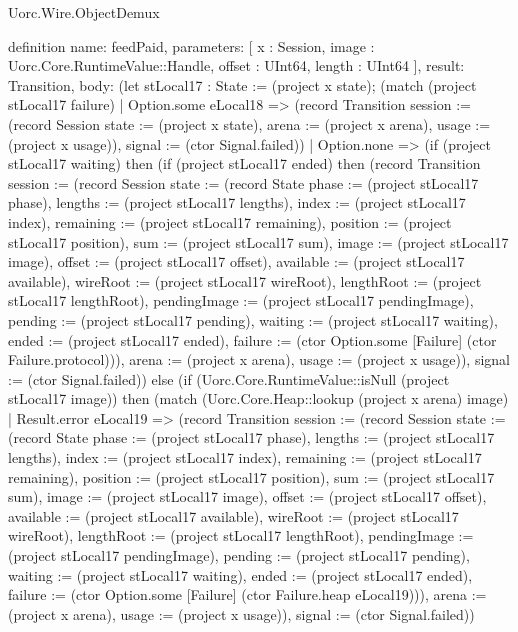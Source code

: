 \begin{lexlean}{Uorc.Wire.ObjectDemux}
\begin{semanticmodule}
definition{
  name: feedPaid,
  parameters: [
    x : Session,
    image : Uorc.Core.RuntimeValue::Handle,
    offset : UInt64,
    length : UInt64
  ],
  result: Transition,
  body: (let stLocal17 : State := (project x state); (match (project stLocal17 failure)
    | Option.some eLocal18 => (record Transition {session := (record Session {state := (project x state), arena := (project x arena), usage := (project x usage)}), signal := (ctor Signal.failed)})
    | Option.none => (if (project stLocal17 waiting) then (if (project stLocal17 ended) then (record Transition {session := (record Session {state := (record State {phase := (project stLocal17 phase), lengths := (project stLocal17 lengths), index := (project stLocal17 index), remaining := (project stLocal17 remaining), position := (project stLocal17 position), sum := (project stLocal17 sum), image := (project stLocal17 image), offset := (project stLocal17 offset), available := (project stLocal17 available), wireRoot := (project stLocal17 wireRoot), lengthRoot := (project stLocal17 lengthRoot), pendingImage := (project stLocal17 pendingImage), pending := (project stLocal17 pending), waiting := (project stLocal17 waiting), ended := (project stLocal17 ended), failure := (ctor Option.some [Failure] (ctor Failure.protocol))}), arena := (project x arena), usage := (project x usage)}), signal := (ctor Signal.failed)}) else (if (Uorc.Core.RuntimeValue::isNull (project stLocal17 image)) then (match (Uorc.Core.Heap::lookup (project x arena) image)
      | Result.error eLocal19 => (record Transition {session := (record Session {state := (record State {phase := (project stLocal17 phase), lengths := (project stLocal17 lengths), index := (project stLocal17 index), remaining := (project stLocal17 remaining), position := (project stLocal17 position), sum := (project stLocal17 sum), image := (project stLocal17 image), offset := (project stLocal17 offset), available := (project stLocal17 available), wireRoot := (project stLocal17 wireRoot), lengthRoot := (project stLocal17 lengthRoot), pendingImage := (project stLocal17 pendingImage), pending := (project stLocal17 pending), waiting := (project stLocal17 waiting), ended := (project stLocal17 ended), failure := (ctor Option.some [Failure] (ctor Failure.heap eLocal19))}), arena := (project x arena), usage := (project x usage)}), signal := (ctor Signal.failed)})
}
\end{semanticmodule}
\end{lexlean}
